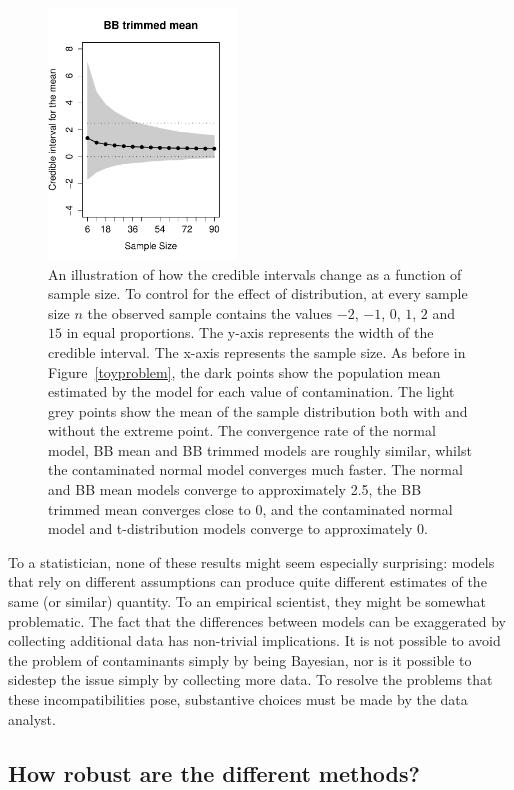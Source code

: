 \documentclass[doc]{apa6}
\begin{document}
{\begin{figure}[p]
    \includegraphics[width=5.0cm]{CI2_bbtm.pdf}
    \caption{An illustration of how the credible intervals change as a function of sample size. To control for the effect of distribution, at every sample size $n$ the observed sample contains the values $-2$, $-1$, $0$, $1$, $2$ and $15$ in equal proportions. The y-axis represents the width of the credible interval. The x-axis represents the sample size.   As before in Figure~\ref{toyproblem}, the  dark points show the population mean estimated by the model for each value of contamination. The light grey points show the mean of the sample distribution both with and without the extreme point.   The convergence rate of the normal model, BB mean and BB trimmed models are roughly similar, whilst the contaminated normal model converges much faster. The normal and BB mean models converge to approximately 2.5, the BB trimmed mean converges close to 0, and the contaminated normal model   and t-distribution models converge   to approximately 0.}
    \label{toyproblem2}
\end{figure}

To a statistician, none of these results might seem especially surprising: models that rely on different assumptions can produce quite different estimates of the same (or similar) quantity. To an empirical scientist, they might be somewhat problematic. The fact that the differences between models can be exaggerated by collecting additional data has non-trivial implications. It is not possible to avoid the problem of contaminants simply by being Bayesian, nor is it possible to sidestep the issue simply by collecting more data. To resolve the problems that these incompatibilities pose, substantive choices must be made by the data analyst.


\subsection{How robust are the different methods?}

}
\end{document}
